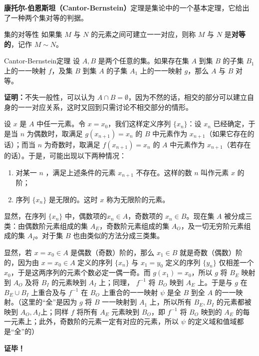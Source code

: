 
\textbf{康托尔-伯恩斯坦（Cantor-Bernstein）}定理是集论中的一个基本定理，它给出了一种两个集对等的判据。
\begin{definition}{集的对等性}
如果集 $M$ 与 $N$ 的元素之间可建立一一对应，则称 $M$ 与 $N$ 是\textbf{对等的}，记作 $M\sim N$。
\end{definition}
\begin{theorem}{Cantor-Bernstein定理}
设 $A,B$ 是两个任意的集。如果存在集 $A$ 到集 $B$ 的子集 $B_1$ 上的一一映射 $f$，及集 $B$ 到集 $A$ 的子集 $A_1$ 上的一一映射 $g$，那么 $A$ 与 $B$ 对等。
\end{theorem}
\textbf{证明：}不失一般性，可以认为 $A\cap B=\emptyset$，因为不然的话，相交的部分可以建立自身的一一对应关系，这时又回到只需讨论不相交部分的情形。

设 $x$ 是 $A$ 中任一元素。令 $x=x_0$，我们这样定义序列 $\{x_n\}$：设 $x_n$ 已经确定，于是当 $n$ 为偶数时，取满足 $g(x_{n+1})=x_n$ 的 $B$ 中元素作为 $x_{n+1}$（如果它存在的话）；而当 $n$ 为奇数时，取满足 $f(x_{n+1})=x_n$ 的 $A$ 中元素作为 $x_{n+1}$（若存在的话）。于是，可能出现以下两种情况：
\begin{enumerate}
\item 对某一 $n$ ，满足上述条件的元素 $x_{n+1}$ 不存在。这样的数 $n$ 叫作元素 $x$ 的阶；
\item 序列 $\{x_n\}$ 是无限的。这时 $x$ 称为无限阶的元素。
\end{enumerate}
显然，在序列 $\{x_n\}$ 中，偶数项的$x_n\in A$，奇数项的 $x_n\in B$。现在集 $A$ 被分成三类：由偶数阶元素组成的集 $A_E$，奇数阶元素组成的集 $A_O$，及一切无穷阶元素组成的集 $A_I$。对于集 $B$ 也由类似的方法分成三类集。

显然，若 $x=x_0\in A$ 是偶数（奇数）阶的，那么 $x_1\in B$ 就是奇数（偶数）阶的，因为由 $x=x_0\in A$ 定义的序列 $\{x_n\}$ 与 $x_1=y_0$ 定义的序列 $\{y_n\}$ 仅相差一个 $x_0$，于是这两序列的元素个数必定一偶一奇。而 $g(x_1)=x_0$，所以 $g$ 将 $B_E$ 映射到 $A_O$ 及将 $B_I$ 的元素映到 $A_I$ 上；同理， $f^{-1}$ 将 $B_O$ 映到 $A_E$ 上。于是与 $g$ 在 $B_E\cup B_I$ 上重合及与 $f^{-1}$ 在 $B_O$ 上重合的一一映射 $\psi$ 是全 $B$ 到全 $A$ 的一一映射。（这里的“全”是因为 $g$ 将 $B$ 一一映射到 $A_1$ 上，所以所有 $B_E,B_I$ 的元素都被映到 $A_O,A_I$上；同样 $f$ 将所有 $A_E$ 元素映到 $B_O$，即 $f^{-1}$ 将 $B_O$ 映到的 $A_E$ 的每一元素上；此外，奇数阶的元素一定有对应的元素，所以 $\psi$ 的定义域和值域都是“全”的）

\textbf{证毕！}
